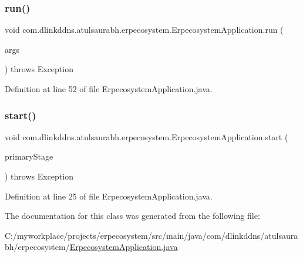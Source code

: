 \subsubsection{\texorpdfstring{run()}{run()}}
{\footnotesize\ttfamily void com.\+dlinkddns.\+atulsaurabh.\+erpecosystem.\+Erpecosystem\+Application.\+run (\begin{DoxyParamCaption}\item[{Application\+Arguments}]{args }\end{DoxyParamCaption}) throws Exception}



Definition at line 52 of file Erpecosystem\+Application.\+java.

\mbox{\label{classcom_1_1dlinkddns_1_1atulsaurabh_1_1erpecosystem_1_1_erpecosystem_application_a90a76d5aca54f84a9873a8121d3d0fad}} 
\subsubsection{\texorpdfstring{start()}{start()}}
{\footnotesize\ttfamily void com.\+dlinkddns.\+atulsaurabh.\+erpecosystem.\+Erpecosystem\+Application.\+start (\begin{DoxyParamCaption}\item[{Stage}]{primary\+Stage }\end{DoxyParamCaption}) throws Exception}



Definition at line 25 of file Erpecosystem\+Application.\+java.



The documentation for this class was generated from the following file\+:\begin{DoxyCompactItemize}
\item 
C\+:/myworkplace/projects/erpecosystem/src/main/java/com/dlinkddns/atulsaurabh/erpecosystem/\mbox{\hyperlink{_erpecosystem_application_8java}{Erpecosystem\+Application.\+java}}\end{DoxyCompactItemize}
